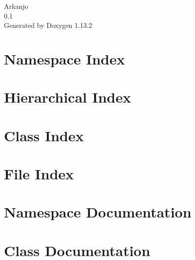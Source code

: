 \documentclass[twoside]{book}
\newcommand{\+}{\discretionary{\mbox{\scriptsize$\hookleftarrow$}}{}{}}
\newcommand{\clearemptydoublepage}{%
    \newpage{\pagestyle{empty}\cleardoublepage}%
  }
\begin{document}
  \raggedbottom
    \hypersetup{pageanchor=false,
                bookmarksnumbered=true,
                pdfencoding=unicode
               }
  \begin{titlepage}
  \vspace*{7cm}
  \begin{center}%
  {\Large Arkanjo}\\
  [1ex]\large 0.\+1 \\
  \vspace*{1cm}
  {\large Generated by Doxygen 1.13.2}\\
  \end{center}
  \end{titlepage}
  \clearemptydoublepage
  \tableofcontents
  \clearemptydoublepage
  \hypersetup{pageanchor=true}



\chapter{Namespace Index}

\chapter{Hierarchical Index}

\chapter{Class Index}

\chapter{File Index}

\chapter{Namespace Documentation}






\chapter{Class Documentation}























\end{document}
